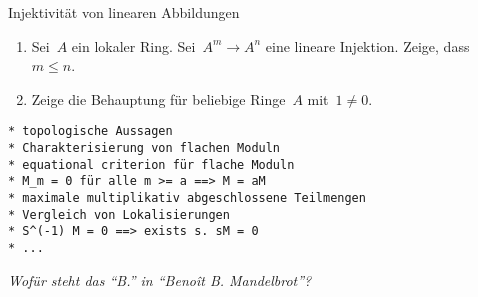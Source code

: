\documentclass[entwurf]{uebblatt}
\begin{document}
\begin{aufgabe}{}{Injektivität von linearen Abbildungen}
\begin{enumerate}
\item Sei~$A$ ein lokaler Ring. Sei~$A^m \to A^n$ eine lineare Injektion.
Zeige, dass~$m \leq n$.
\item Zeige die Behauptung für beliebige Ringe~$A$ mit~$1 \neq 0$.
\end{enumerate}
\end{aufgabe}

\begin{verbatim}
* topologische Aussagen
* Charakterisierung von flachen Moduln
* equational criterion für flache Moduln
* M_m = 0 für alle m >= a ==> M = aM
* maximale multiplikativ abgeschlossene Teilmengen
* Vergleich von Lokalisierungen
* S^(-1) M = 0 ==> exists s. sM = 0
* ...
\end{verbatim}

\centering
\emph{Wofür steht das "`B."' in "`Benoît B. Mandelbrot"'?}
\end{document}
